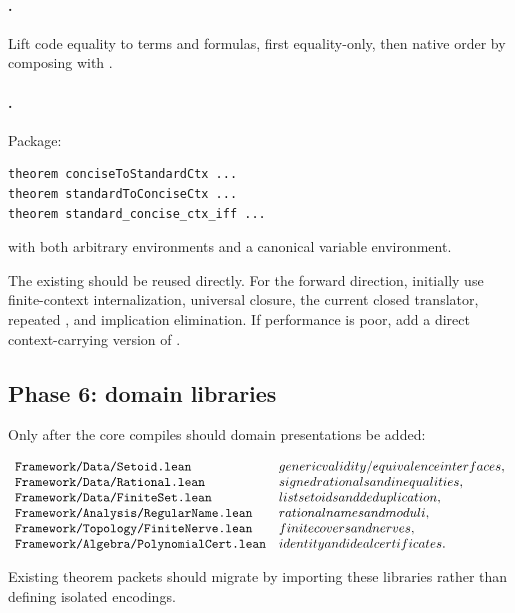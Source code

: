 \paragraph{.}
Lift code equality to terms and formulas, first equality-only, then native
order by composing with .

\paragraph{.}
Package:
\begin{lstlisting}[language={}]
theorem conciseToStandardCtx ...
theorem standardToConciseCtx ...
theorem standard_concise_ctx_iff ...
\end{lstlisting}
with both arbitrary environments and a canonical variable environment.

The existing  should be reused directly.
For the forward direction, initially use finite-context internalization,
universal closure, the current closed translator, repeated
, and implication elimination.  If performance is poor, add
a direct context-carrying version of .

\subsection{Phase 6: domain libraries}

Only after the core compiles should domain presentations be added:

\[
\begin{array}{ll}
\code{Framework/Data/Setoid.lean} & generic validity/equivalence interfaces,\\
\code{Framework/Data/Rational.lean} & signed rationals and inequalities,\\
\code{Framework/Data/FiniteSet.lean} & list setoids and deduplication,\\
\code{Framework/Analysis/RegularName.lean} & rational names and moduli,\\
\code{Framework/Topology/FiniteNerve.lean} & finite covers and nerves,\\
\code{Framework/Algebra/PolynomialCert.lean} & identity and ideal certificates.
\end{array}
\]

Existing theorem packets should migrate by importing these libraries rather
than defining isolated encodings.

